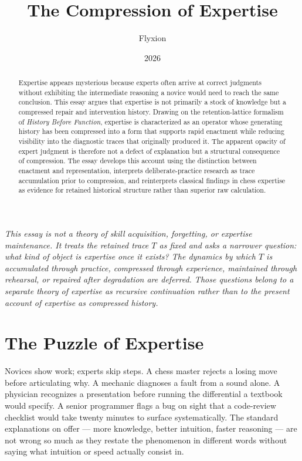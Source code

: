 \documentclass[11pt]{article}
\title{\textbf{The Compression of Expertise}}
\author{Flyxion}
\date{2026}
\begin{document}
\maketitle

\begin{abstract}
Expertise appears mysterious because experts often arrive at correct judgments without exhibiting the intermediate reasoning a novice would need to reach the same conclusion. This essay argues that expertise is not primarily a stock of knowledge but a compressed repair and intervention history. Drawing on the retention-lattice formalism of \emph{History Before Function}, expertise is characterized as an operator whose generating history has been compressed into a form that supports rapid enactment while reducing visibility into the diagnostic traces that originally produced it. The apparent opacity of expert judgment is therefore not a defect of explanation but a structural consequence of compression. The essay develops this account using the distinction between enactment and representation, interprets deliberate-practice research as trace accumulation prior to compression, and reinterprets classical findings in chess expertise as evidence for retained historical structure rather than superior raw calculation.
\end{abstract}

\noindent\textit{This essay is not a theory of skill acquisition, forgetting, or expertise maintenance. It treats the retained trace $T$ as fixed and asks a narrower question: what kind of object is expertise once it exists? The dynamics by which $T$ is accumulated through practice, compressed through experience, maintained through rehearsal, or repaired after degradation are deferred. Those questions belong to a separate theory of expertise as recursive continuation rather than to the present account of expertise as compressed history.}

\section{The Puzzle of Expertise}

Novices show work; experts skip steps. A chess master rejects a losing move before articulating why. A mechanic diagnoses a fault from a sound alone. A physician recognizes a presentation before running the differential a textbook would specify. A senior programmer flags a bug on sight that a code-review checklist would take twenty minutes to surface systematically. The standard explanations on offer — more knowledge, better intuition, faster reasoning — are not wrong so much as they restate the phenomenon in different words without saying what intuition or speed actually consist in.
\end{document}
